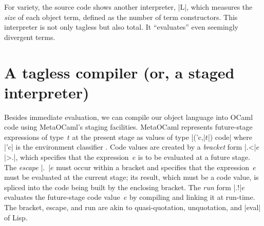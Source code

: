 For variety, the source code shows another interpreter, |L|, which measures
the \emph{size} of each object term, defined as the number of term
constructors. This interpreter is not only tagless but also total. It
``evaluates'' even seemingly divergent terms.
\begin{comment}
For variety, we show another interpreter, which measures the \emph{size}
of each object term, defined as the number of term
constructors. The following is slightly abbreviated code (see the
accompanying source code for the complete definition).
\begin{code}
module L = struct
  type ('c,'dv) repr = int
  let int (x:int)  = 1
  let lam f        = f 0 + 1
  let app e1 e2    = e1 + e2 + 1
  let fix f        = f 0 + 1
  let mul e1 e2    = e1 + e2 + 1
  let if_ eb et ee = eb + et () + ee () + 1
end
\end{code}
Now the expression
\begin{code}
let module E = EX(L) in E.test1 ()
\end{code}
evaluates to |3|. This interpreter is not only tagless but also
total. It ``evaluates'' even seemingly divergent terms like
\begin{code}
app (fix (fun self -> self)) (int 1)
\end{code}

module EX1(S: Symantics) = struct
 open S
 let tfix () = app (fix (fun self -> self)) (int 1)
end;;
let module E =EX1(R) in E.tfix ();;
let module E =EX1(L) in E.tfix ();;
\end{comment}

\section{A tagless compiler (or, a staged interpreter)}\label{compiler}
\vspace{-5pt}
Besides immediate evaluation, we can compile our object language
into OCaml code using MetaOCaml's staging facilities. MetaOCaml
represents future-stage expressions of type~$t$ at the
present stage as values of type |('c,|$t$|) code| where |'c| is the
environment classifier \cite{WalidPOPL03,calcagno-ml-like}. Code values are created
by a \emph{bracket} form |.<|$e$|>.|, which specifies that the expression~$e$ is to be
evaluated at a future stage. The \emph{escape} |.~|$e$ must occur
within a bracket and specifies that the expression~$e$ must be evaluated
at the current stage; its result, which must be a code value, is
spliced into the code being built by the enclosing bracket. The \emph{run} form |.!|$e$ evaluates
the future-stage code value~$e$ by compiling and linking it at run-time.
The bracket, escape, and run are akin to
quasi-quotation, unquotation, and |eval| of Lisp.

